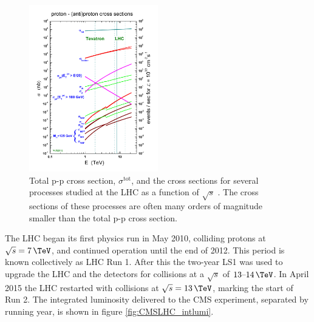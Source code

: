 \begin{figure}[h!]
\includegraphics[width=0.5\textwidth]{./Detector/Plots/crosssections2013.jpg}
\caption[Total p-p cross section, and the cross sections for
several processes studied at the LHC.]{Total p-p cross section, $\sigma^{\text{tot}}$, and the cross sections
for several processes studied at the LHC as a function of $\sqrt{s}$ \cite{stirling-crosssection}.
The cross sections of these processes
are often many orders of magnitude smaller than the total p-p cross section.}
\label{fig:stirling_xs}
\end{figure}

The \ac{LHC} began its first physics run in May 2010, colliding protons at
$\sqrt{s}=7\,\TeV$, and continued operation until the end of 2012. This period is known
collectively as \ac{LHC} Run 1. After this the 
two-year \ac{LS1} was used to upgrade the \ac{LHC} and the detectors for collisions at a
$\sqrt{s}$ of $13\text{--}14\,\TeV$. In April 2015 the \ac{LHC} restarted with collisions at 
$\sqrt{s}=13\,\TeV$, marking the start of Run 2. The integrated luminosity delivered to the \ac{CMS} experiment, separated by running year, is shown in
figure \ref{fig:CMSLHC_intlumi}.

